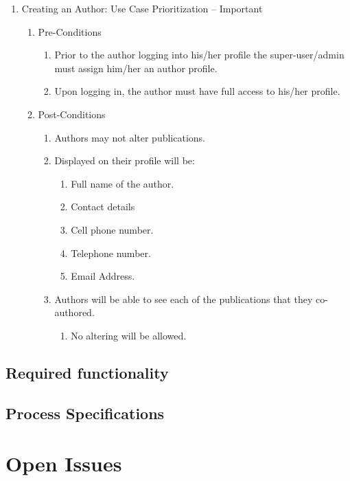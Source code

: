 \documentclass[10pt,a4paper]{exam}
\begin{document}
\noindent 

\begin{enumerate}
\item  Creating an Author: Use Case Prioritization -- Important

\begin{enumerate}
\item  Pre-Conditions

\begin{enumerate}
\item  Prior to the author logging into his/her profile the super-user/admin must assign him/her an author profile.

\item  Upon logging in, the author must have full access to his/her profile.
\end{enumerate}

\item  Post-Conditions

\begin{enumerate}
\item  Authors may not alter publications.

\item  Displayed on their profile will be:

\begin{enumerate}
\item  Full name of the author.

\item  Contact details

\item  Cell phone number.

\item  Telephone number.

\item  Email Address.
\end{enumerate}

\item  Authors will be able to see each of the publications that they co-authored.

\begin{enumerate}
\item  No altering will be allowed. 
\end{enumerate}
\end{enumerate}
\end{enumerate}
\end{enumerate}

\noindent 

\subsection{Required functionality}
\lipsum[8]
\subsection{Process Specifications}
\lipsum[9]

\section{Open Issues}
\lipsum[10]
%
%
\end{document}
